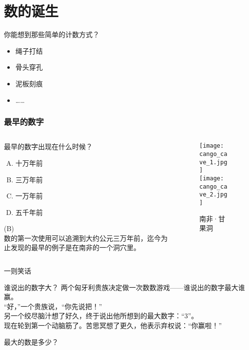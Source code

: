 \section{数的诞生}

\begin{frame}
	\begin{block}{你能想到那些简单的计数方式？}\pause
		\begin{itemize}[<+-| alert@+>]
			\item 绳子打结
			\item 骨头穿孔
			\item 泥板刻痕
			\item ……
		\end{itemize}
	\end{block}
\end{frame}

\begin{frame}\frametitle{最早的数字}
	\begin{columns}[c]
		\begin{column}{0.6\textwidth}
			\begin{question}
				最早的数字出现在什么时候？\\
				\begin{enumerate}[(A)]
					\item 十万年前
					\item 三万年前
					\item 一万年前
					\item 五千年前
				\end{enumerate}
			\end{question}\pause
			\begin{answer}
				(B)\\
				数的第一次使用可以追溯到大约公元三万年前，迄今为止发现的最早的例子是在南非的一个洞穴里。
			\end{answer}\pause
		\end{column}
	\begin{column}{0.3\textwidth}
		\begin{figure}
			\texttt{[image: cango\_cave\_1.jpg]}\\
			\texttt{[image: cango\_cave\_2.jpg]}
			\caption{南非·甘果洞}
		\end{figure}
	\end{column}
	\end{columns}
\end{frame}

\begin{frame}{一则笑话}
	\begin{block}{谁说出的数字大？}\pause
	{
		两个匈牙利贵族决定做一次数数游戏——谁说出的数字最大谁赢。\\
		``好，''一个贵族说，``你先说把！''\\
		另一个绞尽脑汁想了好久，终于说出他所想到的最大数字：``3''。\\
		现在轮到第一个动脑筋了。苦思冥想了更久，他表示弃权说：``你赢啦！''\\
	}
	\end{block}\pause
	\begin{question}
		最大的数是多少？
	\end{question}
\end{frame}